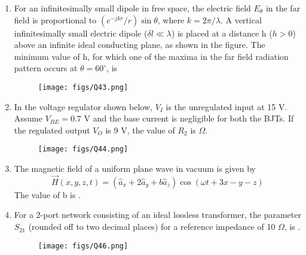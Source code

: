 \documentclass[a4paper, 11pt]{article}
\begin{document}
\begin{enumerate}
    \item For an infinitesimally small dipole in free space, the electric field $E_{\theta}$ in the far field is proportional to $(e^{-jkr}/r)\sin\theta$, where $k=2\pi/\lambda$. A vertical infinitesimally small electric dipole ($\delta l \ll \lambda$) is placed at a distance h ($h>0$) above an infinite ideal conducting plane, as shown in the figure. The minimum value of h, for which one of the maxima in the far field radiation pattern occurs at $\theta = 60^{\circ}$, is
    \begin{figure}[H]
        \centering
        \texttt{[image: figs/Q43.png]}
        \caption*{}
        \label{fig:q53}
    \end{figure}
    \begin{enumerate}
    \end{enumerate}

    \hfill{}

    \item In the voltage regulator shown below, $V_I$ is the unregulated input at 15 V. Assume $V_{BE} = 0.7$ V and the base current is negligible for both the BJTs. If the regulated output $V_O$ is 9 V, the value of $R_2$ is \underline{\hspace{2cm}} $\Omega$.
    \begin{figure}[H]
        \centering
        \texttt{[image: figs/Q44.png]}
        \caption*{}
        \label{fig:q54}
    \end{figure}

    \hfill{}
    
    \item The magnetic field of a uniform plane wave in vacuum is given by
    $$\vec{H}(x,y,z,t) = (\hat{a}_x + 2\hat{a}_y + b\hat{a}_z)\cos(\omega t + 3x - y - z)$$
    The value of b is \underline{\hspace{2cm}}.
    
    \hfill{}

    \item For a 2-port network consisting of an ideal lossless transformer, the parameter $S_{21}$ (rounded off to two decimal places) for a reference impedance of 10 $\Omega$, is \underline{\hspace{2cm}}.
    \begin{figure}[H]
        \centering
        \texttt{[image: figs/Q46.png]}
        \caption*{}
        \label{fig:q56}
    \end{figure}
    

\end{enumerate}
\end{document}
